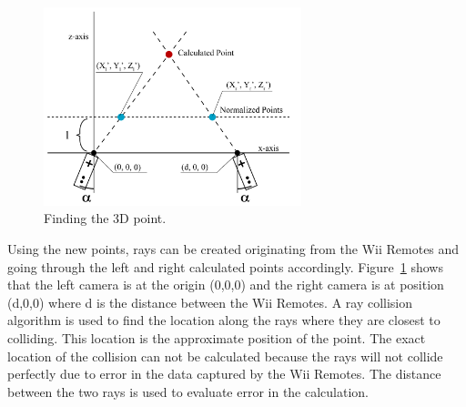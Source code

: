 \documentclass[a4paper,twoside]{article}
\begin{document}
\begin{figure}[h]
\includegraphics[width = 7.5cm]{Diagram4_FinalPoint.png}
\caption{Finding the 3D point.}
\label{finalpoint}
\end{figure}

Using the new points, rays can be created originating from the Wii Remotes and going through the left and right calculated points accordingly. Figure~\ref{finalpoint} shows that the left camera is at the origin (0,0,0) and the right camera is at position (d,0,0) where d is the distance between the Wii Remotes. A ray collision algorithm is used to find the location along the rays where they are closest to colliding. This location is the approximate position of the point. The exact location of the collision can not be calculated because the rays will not collide perfectly due to error in the data captured by the Wii Remotes. The distance between the two rays is used to evaluate error in the calculation.
\end{document}
